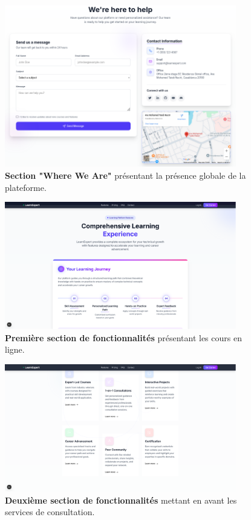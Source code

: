\begin{figure}[h!]
  \centering
  \includegraphics[width=0.9\textwidth,keepaspectratio]{week_2_img/where_we_are_section.png}
  \caption{\textbf{Section "Where We Are"} présentant la présence globale de la plateforme.}
  \label{fig:where_we_are}
\end{figure}

\begin{figure}[h!]
  \centering
  \includegraphics[width=0.9\textwidth,keepaspectratio]{week_2_img/featchersection_1.png}
  \caption{\textbf{Première section de fonctionnalités} présentant les cours en ligne.}
  \label{fig:features_section_1}
\end{figure}

\begin{figure}[h!]
  \centering
  \includegraphics[width=0.9\textwidth,keepaspectratio]{week_2_img/fetchersection_2.png}
  \caption{\textbf{Deuxième section de fonctionnalités} mettant en avant les services de consultation.}
  \label{fig:features_section_2}
\end{figure}

